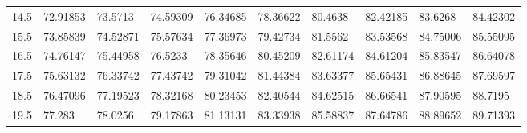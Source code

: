 \documentclass[10pt,twocolumn,letterpaper]{article}
\begin{document}
\begin{table}
{\begin{tabular}{llllllllll}
    14.5            & 72.91853                               & 73.5713                                & 74.59309                                & 76.34685                                & 78.36622                                & 80.4638                                 & 82.42185                                & 83.6268                                 & 84.42302                                \\
    15.5            & 73.85839                               & 74.52871                               & 75.57634                                & 77.36973                                & 79.42734                                & 81.5562                                 & 83.53568                                & 84.75006                                & 85.55095                                \\
    16.5            & 74.76147                               & 75.44958                               & 76.5233                                 & 78.35646                                & 80.45209                                & 82.61174                                & 84.61204                                & 85.83547                                & 86.64078                                \\
    17.5            & 75.63132                               & 76.33742                               & 77.43742                                & 79.31042                                & 81.44384                                & 83.63377                                & 85.65431                                & 86.88645                                & 87.69597                                \\
    18.5            & 76.47096                               & 77.19523                               & 78.32168                                & 80.23453                                & 82.40544                                & 84.62515                                & 86.66541                                & 87.90595                                & 88.7195                                 \\
    19.5            & 77.283                                 & 78.0256                                & 79.17863                                & 81.13131                                & 83.33938                                & 85.58837                                & 87.64786                                & 88.89652                                & 89.71393                                \\

\end{tabular}}
\end{table}
\end{document}
